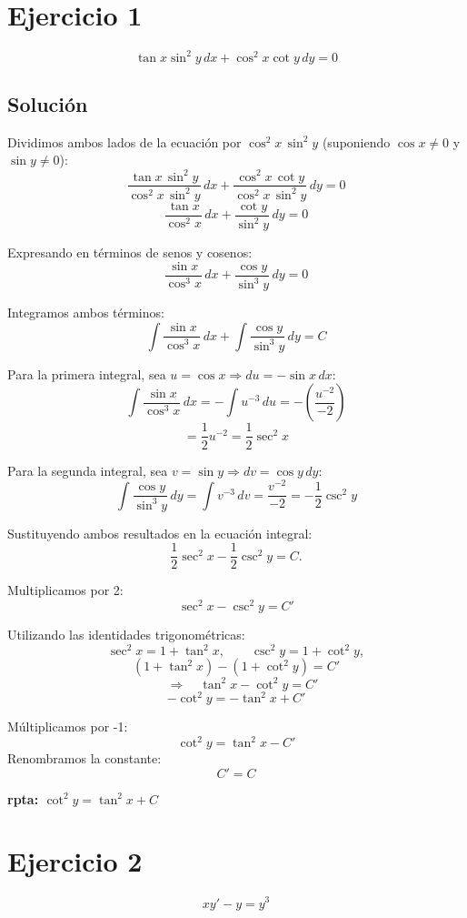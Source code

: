\documentclass[12pt,a4paper]{article}
\begin{document}
\begin{multicols}{2}
  

\section*{Ejercicio 1}
\[\tan x \sin^2 y \, dx + \cos^2 x \cot y \, dy = 0\]
\subsection*{Solución}
Dividimos ambos lados de la ecuación por $\cos^{2}x \, \sin^{2}y$ (suponiendo $\cos x \neq 0$ y $\sin y \neq 0$):
\[
\frac{\tan x \, \sin^{2}y}{\cos^{2}x \, \sin^{2}y} \, dx 
+ 
\frac{\cos^{2}x \, \cot y}{\cos^{2}x \, \sin^{2}y} \, dy = 0
\]
\[
\frac{\tan x}{\cos^{2}x} \, dx + \frac{\cot y}{\sin^{2}y} \, dy = 0
\]

Expresando en términos de senos y cosenos:
\[
\frac{\sin x}{\cos^{3}x} \, dx + \frac{\cos y}{\sin^{3}y} \, dy = 0
\]

Integramos ambos términos:
\[
\int \frac{\sin x}{\cos^{3}x} \, dx + \int \frac{\cos y}{\sin^{3}y} \, dy = C
\]

\noindent
Para la primera integral, sea $u = \cos x \Rightarrow du = -\sin x \, dx$:
\[
\int \frac{\sin x}{\cos^{3}x} \, dx 
= -\int u^{-3} \, du 
= -\left( \frac{u^{-2}}{-2} \right)
\]
\[
= \frac{1}{2}u^{-2}
= \frac{1}{2}\sec^{2}x
\]

\noindent
Para la segunda integral, sea $v = \sin y \Rightarrow dv = \cos y \, dy$:
\[
\int \frac{\cos y}{\sin^{3}y} \, dy
= \int v^{-3} \, dv
= \frac{v^{-2}}{-2}
= -\frac{1}{2}\csc^{2}y
\]

Sustituyendo ambos resultados en la ecuación integral:
\[
\frac{1}{2}\sec^{2}x - \frac{1}{2}\csc^{2}y = C.
\]

Multiplicamos por 2:
\[
\sec^{2}x - \csc^{2}y = C'
\]

Utilizando las identidades trigonométricas:
\[
\sec^{2}x = 1 + \tan^{2}x, 
\qquad 
\csc^{2}y = 1 + \cot^{2}y,
\]
\[
(1+\tan^{2}x) - (1+\cot^{2}y) = C'
\]
\[
\quad \Rightarrow \quad
\tan^{2}x - \cot^{2}y = C'
\]
\[
 - \cot^{2}y = - \tan^{2}x + C'
\]

Múltiplicamos por -1:
\[
\cot^{2}y = \tan^{2}x - C'
\]
Renombramos la constante:
\[
C' = C
\]

\textbf{rpta: $\cot^{2}y = \tan^{2}x + C$}

\section*{Ejercicio 2}
\[xy\prime -y=y^3\]

\end{multicols}
\end{document}
